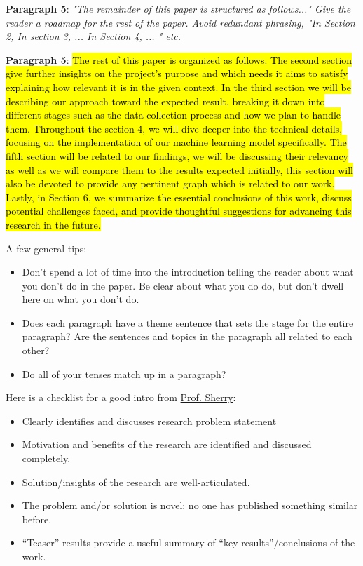 \textbf{Paragraph 5}: \textit{"The remainder of this paper is structured as follows..." Give the reader a roadmap for the rest of the paper. Avoid redundant phrasing, "In Section 2, In section 3, ... In Section 4, ... " etc.}

\textbf{Paragraph 5}: \hl{The rest of this paper is organized as follows. The second section give further insights on the project's purpose and which needs it aims to satisfy explaining how relevant it is in the given context. In the third section we will be describing our approach toward the expected result, breaking it down into different stages such as the data collection process and how we plan to handle them. Throughout the section 4, we will dive deeper into the technical details, focusing on the implementation of our machine learning model specifically. The fifth section will be related to our findings, we will be discussing their relevancy as well as we will compare them to the results expected initially, this section will also be devoted to provide any pertinent graph which is related to our work. Lastly, in Section 6, we summarize the essential conclusions of this work, discuss potential challenges faced, and provide thoughtful suggestions for advancing this research in the future.}

A few general tips:
\begin{itemize}
    \item Don't spend a lot of time into the introduction telling the reader about what you don't do in the paper. Be clear about what you do do, but don't dwell here on what you don't do.
    \item Does each paragraph have a theme sentence that sets the stage for the entire paragraph? Are the sentences and topics in the paragraph all related to each other?
    \item Do all of your tenses match up in a paragraph?
\end{itemize}


Here is a checklist for a good intro from \href{https://docs.google.com/document/d/14g-4txTMwJ4YL61qOcaH6bJWKh59PkI1S-FB1KjeMS4/edit}{Prof. Sherry}: 
\begin{itemize}
    \item Clearly identifies and discusses research problem statement
    \item Motivation and benefits of the research are identified and discussed completely.
    \item Solution/insights of the research are well-articulated.
    \item The problem and/or solution is novel: no one has published something similar before.
    \item ``Teaser'' results provide a useful summary of ``key results''/conclusions of the work.
\end{itemize}


